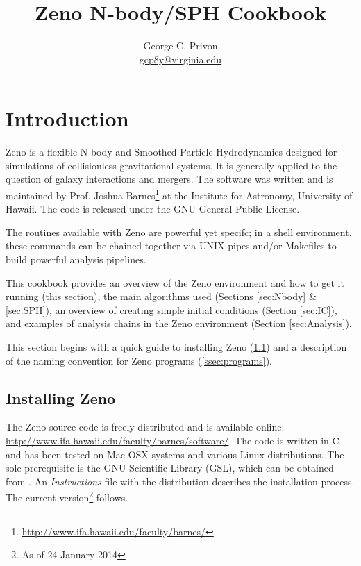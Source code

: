 \documentclass[11pt,letterpaper]{article}
\begin{document}
\title{Zeno N-body/SPH Cookbook}
\author{George C. Privon\\ \href{mailto:gcp8y@virginia.edu}{gcp8y@virginia.edu}}

\maketitle

\section{Introduction}
\label{sec:Introduction}

Zeno is a flexible N-body and Smoothed Particle Hydrodynamics designed for simulations of collisionless gravitational systems. It is generally applied to the question of galaxy interactions and mergers. The software was written and is maintained by Prof. Joshua Barnes\footnote{\url{http://www.ifa.hawaii.edu/faculty/barnes/}} at the Institute for Astronomy, University of Hawaii. The code is released under the GNU General Public License.

The routines available with Zeno are powerful yet specifc; in a shell environment, these commands can be chained together via UNIX pipes and/or Makefiles to build powerful analysis pipelines.

This cookbook provides an overview of the Zeno environment and how to get it running (this section), the main algorithms used (Sections \ref{sec:Nbody} \& \ref{sec:SPH}), an overview of creating simple initial conditions (Section \ref{sec:IC}), and examples of analysis chains in the Zeno environment (Section \ref{sec:Analysis}).

This section begins with a quick guide to installing Zeno (\ref{ssec:installing}) and a description of the naming convention for Zeno programs (\ref{ssec:programs}).

\subsection{Installing Zeno}
\label{ssec:installing}

The Zeno source code is freely distributed and is available online: \url{http://www.ifa.hawaii.edu/faculty/barnes/software/}. The code is written in C and has been tested on Mac OSX systems and various Linux distributions. The sole prerequisite is the GNU Scientific Library (GSL), which can be obtained from \url{}{}. An \textit{Instructions} file with the distribution describes the installation process. The current version\footnote{As of 24 January 2014} follows.
\end{document}
